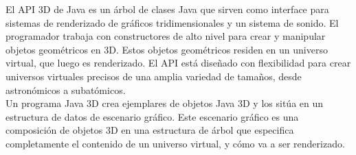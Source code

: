       El API 3D de Java es un árbol de clases Java que sirven como interface para sistemas de renderizado de gráficos tridimensionales y un 
      sistema de sonido. El programador trabaja con constructores de alto nivel para crear y manipular objetos geométricos en 3D. Estos objetos 
      geométricos residen en un universo virtual, que luego es renderizado. El API está diseñado con flexibilidad para crear universos virtuales 
      precisos de una amplia variedad de tamaños, desde astronómicos a subatómicos.\\

      Un programa Java 3D crea ejemplares de objetos Java 3D y los sitúa en un estructura de datos de escenario gráfico. Este escenario gráfico
      es una composición de objetos 3D en una estructura de árbol que especifica completamente el contenido de un universo virtual, y cómo va a
      ser renderizado.\\



















